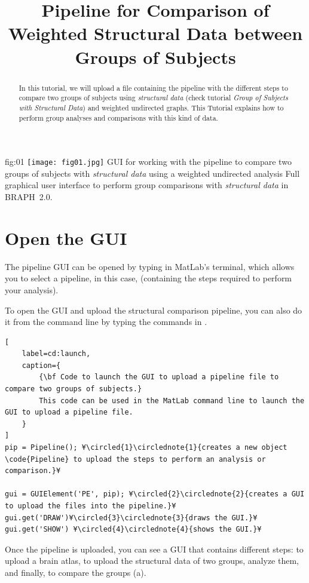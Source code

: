 \documentclass[justified]{tufte-handout}
\title{Pipeline for Comparison of Weighted Structural Data between Groups of Subjects}
\begin{document}
\maketitle

\begin{abstract}
\noindent
In this tutorial, we will upload a file containing the pipeline with the different steps to compare two groups of subjects using \emph{structural data} (check tutorial \emph{Group of Subjects with Structural Data}) and weighted undirected graphs. This Tutorial explains how to perform group analyses and comparisons with this kind of data.
\end{abstract}

\tableofcontents

	{fig:01}
	{\texttt{[image: fig01.jpg]}}
	{GUI for working with the pipeline to compare two groups of subjects with \emph{structural data} using a weighted undirected analysis}
	{
	Full graphical user interface to perform group comparisons with \emph{structural data} in BRAPH~2.0. 
	}

\clearpage
\section{Open the GUI}

The pipeline GUI can be opened by typing  in MatLab's terminal, which allows you to select a pipeline, in this case,  (containing the steps required to perform your analysis).

To open the GUI and upload the structural comparison pipeline, you can also do it from the command line by typing the commands in .
%
\begin{lstlisting}[
	label=cd:launch,
	caption={
		{\bf Code to launch the GUI to upload a pipeline file to compare two groups of subjects.}
		This code can be used in the MatLab command line to launch the GUI to upload a pipeline file.
	}
]
pip = Pipeline(); ¥\circled{1}\circlednote{1}{creates a new object \code{Pipeline} to upload the steps to perform an analysis or comparison.}¥

gui = GUIElement('PE', pip); ¥\circled{2}\circlednote{2}{creates a GUI to upload the files into the pipeline.}¥
gui.get('DRAW')¥\circled{3}\circlednote{3}{draws the GUI.}¥
gui.get('SHOW') ¥\circled{4}\circlednote{4}{shows the GUI.}¥
\end{lstlisting}

Once the pipeline is uploaded, you can see a GUI that contains different steps: to upload a brain atlas, to upload the structural data of two groups, analyze them, and finally, to compare the groups (a). 
\end{document}
